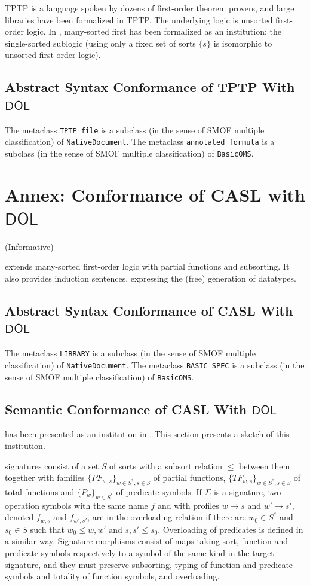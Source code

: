 \documentclass[10pt,fleqn,final]{scrreprt}
\newcommand*{\syntax}[1]{\texttt{#1}}
\newcommand*{\DOL}{\ensuremath{\mathsf{DOL}}\xspace}
\newcommand{\informative}[0]{{\begin{center}{\Large{(Informative})}\end{center}} \bigskip}
\newcommand{\infannex}[1]{ \chapter{Annex: #1}  \informative }
\newenvironment{definitions}[0]{\medskip }{}
\begin{document}
\begin{definitions}
TPTP \cite{TPTP,DBLP:conf/cade/SutcliffeSY94,DBLP:journals/jar/Sutcliffe09}
is a language spoken by dozens of first-order theorem provers,
and large libraries have been formalized in TPTP.
The underlying logic is unsorted first-order logic. In 
\cite{GoguenBurstall92}, many-sorted first has been formalized as
an institution; the single-sorted sublogic (using only a fixed
set of sorts $\{s\}$ is isomorphic to unsorted first-order logic).

\section{Abstract Syntax Conformance of TPTP With \DOL}

The metaclass \syntax{TPTP\_file} is a subclass (in the sense of SMOF
multiple classification) of \syntax{NativeDocument}.
The metaclass \syntax{annotated\_formula} is a subclass (in the sense of SMOF
multiple classification) of \syntax{BasicOMS}.

\infannex{Conformance of CASL with \DOL}\label{a:casl}


\CASL \cite{CASL-RM} extends many-sorted first-order logic with
partial functions and subsorting.  It also provides induction
sentences, expressing the (free) generation of datatypes. 


\section{Abstract Syntax Conformance of CASL With \DOL}

The metaclass \syntax{LIBRARY} is a subclass (in the sense of SMOF
multiple classification) of \syntax{NativeDocument}.
The metaclass \syntax{BASIC\_SPEC} is a subclass (in the sense of SMOF
multiple classification) of \syntax{BasicOMS}.

\section{Semantic Conformance of CASL With \DOL}
 \CASL has
been presented as an institution in \cite{Mossakowski02,CASL-RM}. This section presents
a sketch of this institution.

\CASL signatures consist of a set $S$ of sorts with a subsort relation $\leq$ between them
together with
families $\{PF_{w,s}\}_{w\in S^*, s\in S}$ of partial functions,
$\{TF_{w,s}\}_{w\in S^*, s\in S}$ of total functions and
$\{P_w\}_{w\in S^*}$ of predicate symbols. 
If $\Sigma$ is a signature, 
two operation symbols with the same name $f$ and with profiles
$w\rightarrow s$ and $w'\rightarrow s'$, denoted $f_{w,s}$ and $f_{w',s'}$, are in the
overloading relation if there are $w_0\in S^*$ and $s_0\in S$ such
that $w_0\leq w, w'$ and $s,s' \leq s_0$. Overloading of predicates is defined in a similar way.
Signature morphisms consist of maps taking sort, function and predicate symbols
respectively to a symbol of the same kind in the target signature, and they 
must preserve subsorting, typing of function and predicate symbols and totality of function symbols,
 and overloading. 


\end{definitions}
\end{document}
